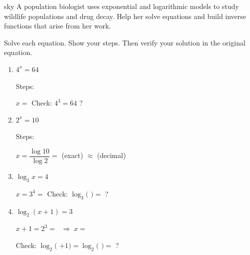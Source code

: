 \documentclass[10pt]{article}
\begin{document}
\namepartnerperiod

\vspace{0.08in}

\begin{scenariobox}{sky}
A population biologist uses exponential and logarithmic models to study wildlife populations
and drug decay. Help her solve equations and build inverse functions that arise from her work.
\end{scenariobox}

\vspace{0.08in}

\begin{tcolorbox}[colback=white, colframe=black!40,
    title=\textbf{Tier R --- Remediate},
    fonttitle=\bfseries, arc=2mm, left=3mm, right=3mm, top=2mm, bottom=2mm]

Solve each equation. Show your steps. Then verify your solution in the original equation.

\begin{enumerate}[leftmargin=1.8em, itemsep=10pt]

\item $4^x = 64$

\vspace{6pt}
Steps: 

$x = $  \qquad Check: $4^{3} = 64$ \checkmark? 

\item $2^x = 10$

\vspace{6pt}
Steps: 

$x = \dfrac{\log 10}{\log 2} = $  (exact) $\approx$  (decimal)

\item $\log_3 x = 4$

\vspace{6pt}
$x = 3^4 = $  \qquad Check: $\log_3($  $) = $  \checkmark? 

\item $\log_2(x+1) = 3$

\vspace{6pt}
$x + 1 = 2^3 = $  $\;\Rightarrow\; x = $ 

Check: $\log_2($  $+ 1) = \log_2($  $) = $  \checkmark? 

\end{enumerate}
\end{tcolorbox}
\end{document}
